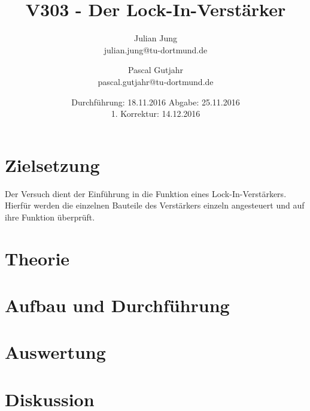 

\title{V303 - Der Lock-In-Verstärker}
\author{Julian Jung \\ julian.jung@tu-dortmund.de
  \and Pascal Gutjahr \\ pascal.gutjahr@tu-dortmund.de}
  \date{Durchführung: 18.11.2016
  \hspace{3em}
  Abgabe: 25.11.2016 \\
  1. Korrektur: 14.12.2016}
  
\maketitle
\newpage
\tableofcontents
\newpage
\section{Zielsetzung}
Der Versuch dient der Einführung in die Funktion eines Lock-In-Verstärkers.
Hierfür werden die einzelnen Bauteile des Verstärkers einzeln angesteuert und
auf ihre Funktion überprüft.
\section{Theorie}

\section{Aufbau und Durchführung}

\section{Auswertung}

\newpage
\section{Diskussion}

\printbibliography

